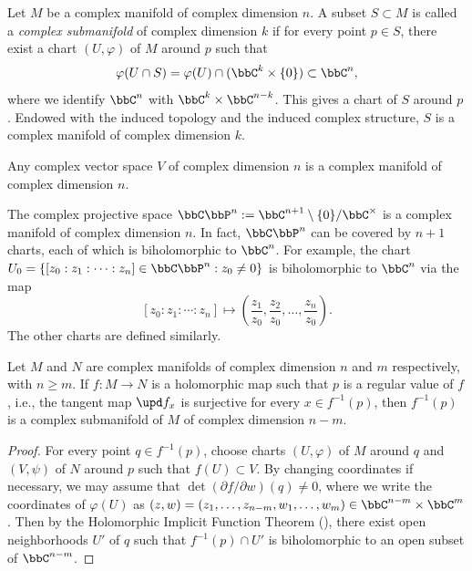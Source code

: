 \begin{definition}\label{def:submanifold_of_complex_manifold}
	Let \(M\) be a complex manifold of complex dimension \(n\).
	A subset \(S\subset M\) is called a \emph{complex submanifold} of complex dimension \(k\) if for every point \(p\in S\), there exist a chart \((U,\varphi)\) of \(M\) around \(p\) such that
	\[
		\varphi(U\cap S) = \varphi(U)\cap (\bbC^k\times \{0\}) \subset \bbC^n,
	\]
	where we identify \(\bbC^n\) with \(\bbC^k\times \bbC^{n-k}\).
	This gives a chart of \(S\) around \(p\).
	Endowed with the induced topology and the induced complex structure, \(S\) is a complex manifold of complex dimension \(k\).
\end{definition}

\begin{example}\label{eg:complex_vector_space_as_complex_manifold}
	Any complex vector space \(V\) of complex dimension \(n\) is a complex manifold of complex dimension \(n\).
\end{example}

\begin{example}\label{eg:complex_projective_space_as_complex_manifold}
	The complex projective space \(\bbC\bbP^n:= \bbC^{n+1}\setminus \{0\}/\bbC^\times\) is a complex manifold of complex dimension \(n\).
	In fact, \(\bbC\bbP^n\) can be covered by \(n+1\) charts, each of which is biholomorphic to \(\bbC^n\).
	For example, the chart \(U_0 = \{[z_0: z_1: \cdots: z_n]\in \bbC\bbP^n: z_0\neq 0\}\) is biholomorphic to \(\bbC^n\) via the map
	\[
		[z_0: z_1: \cdots: z_n] \mapsto \left(\frac{z_1}{z_0}, \frac{z_2}{z_0}, \ldots, \frac{z_n}{z_0}\right).
	\]
	The other charts are defined similarly.
\end{example}

\begin{proposition}\label{prop:complex_submanifold_by_holomorphic_implicit_function_theorem}
	Let \(M\) and \(N\) are complex manifolds of complex dimension \(n\) and \(m\) respectively, with \(n \geq m\).
	If \(f: M\to N\) is a holomorphic map such that \(p\) is a regular value of \(f\),
	i.e., the tangent map \(\upd f_x\) is surjective for every \(x\in f^{-1}(p)\),
	then \(f^{-1}(p)\) is a complex submanifold of \(M\) of complex dimension \(n - m\).
\end{proposition}
\begin{proof}
	For every point \(q\in f^{-1}(p)\), choose charts \((U,\varphi)\) of \(M\) around \(q\) and \((V,\psi)\) of \(N\) around \(p\) such that \(f(U) \subset V\).
	By changing coordinates if necessary, we may assume that \(\det(\partial f/\partial w)(q) \neq 0\),
	where we write the coordinates of \(\varphi(U)\) as \((z,w) = (z_1, \ldots, z_{n-m}, w_1, \ldots, w_m) \in \bbC^{n-m} \times \bbC^m\).
  Then by the Holomorphic Implicit Function Theorem (\Yang{}),
	there exist open neighborhoods \(U'\) of \(q\) such that \(f^{-1}(p)\cap U'\) is biholomorphic to an open subset of \(\bbC^{n-m}\).
\end{proof}


